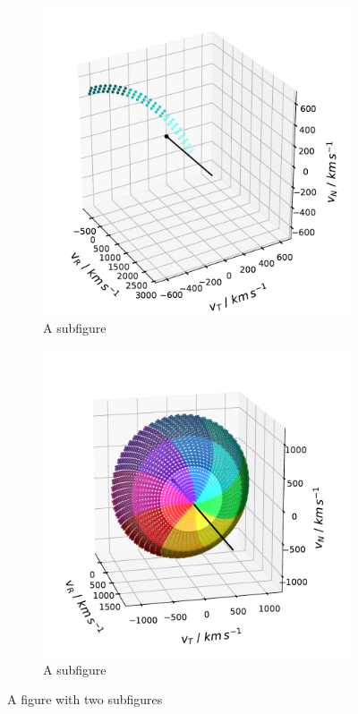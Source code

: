 %
\begin{figure}
	\centering
	\begin{subfigure}{.5\textwidth}
		\centering
		\includegraphics[width=1\linewidth]{Figures/col_single_new.pdf}
		\caption{A subfigure}
		\label{fig:sub1}
	\end{subfigure}%
	\begin{subfigure}{.5\textwidth}
		\centering
		\includegraphics[width=1\linewidth]{Figures/col_vspace_normal.pdf}
		\caption{A subfigure}
		\label{fig:sub2}
	\end{subfigure}
	\caption{A figure with two subfigures}
	\label{fig:test}
\end{figure}
